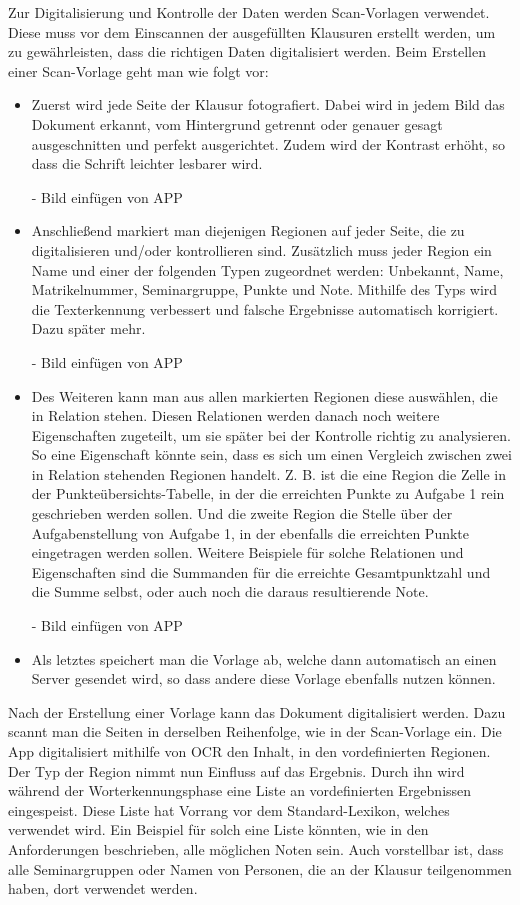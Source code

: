\documentclass[nomenclature, onesided, 150]{HSMW-Thesis}
\begin{document}
	Zur Digitalisierung und Kontrolle der Daten werden Scan-Vorlagen verwendet. Diese muss vor dem Einscannen der ausgefüllten Klausuren erstellt werden, um zu gewährleisten, dass die richtigen Daten digitalisiert werden. Beim Erstellen einer Scan-Vorlage geht man wie folgt vor:
	\begin{itemize}
		\item Zuerst wird jede Seite der Klausur fotografiert. Dabei wird in jedem Bild das Dokument erkannt, vom Hintergrund getrennt oder genauer gesagt ausgeschnitten und perfekt ausgerichtet. Zudem wird der Kontrast erhöht, so dass die Schrift leichter lesbarer wird.
		
			- Bild einfügen von APP
		
		\item Anschließend markiert man diejenigen Regionen auf jeder Seite, die zu digitalisieren und/oder kontrollieren sind. Zusätzlich muss jeder Region ein Name und einer der folgenden Typen zugeordnet werden: Unbekannt, Name, Matrikelnummer, Seminargruppe, Punkte und Note. Mithilfe des Typs wird die Texterkennung verbessert und falsche Ergebnisse automatisch korrigiert. Dazu später mehr.
		
			- Bild einfügen von APP
			
		\item Des Weiteren kann man aus allen markierten Regionen diese auswählen, die in Relation stehen. Diesen Relationen werden danach noch weitere Eigenschaften zugeteilt, um sie später bei der Kontrolle richtig zu analysieren. So eine Eigenschaft könnte sein, dass es sich um einen Vergleich zwischen zwei in Relation stehenden Regionen handelt. Z. B. ist die eine Region die Zelle in der Punkteübersichts-Tabelle, in der die erreichten Punkte zu Aufgabe 1 rein geschrieben werden sollen. Und die zweite Region die Stelle über der Aufgabenstellung von Aufgabe 1, in der ebenfalls die erreichten Punkte eingetragen werden sollen. Weitere Beispiele für solche Relationen und Eigenschaften sind die Summanden für die erreichte Gesamtpunktzahl und die Summe selbst, oder auch noch die daraus resultierende Note.
		
			- Bild einfügen von APP
		
		\item Als letztes speichert man die Vorlage ab, welche dann automatisch an einen Server gesendet wird, so dass andere diese Vorlage ebenfalls nutzen können.
	\end{itemize}
	
	Nach der Erstellung einer Vorlage kann das Dokument digitalisiert werden. Dazu scannt man die Seiten in derselben Reihenfolge, wie in der Scan-Vorlage ein. Die App digitalisiert mithilfe von OCR den Inhalt, in den vordefinierten Regionen. Der Typ der Region nimmt nun Einfluss auf das Ergebnis. Durch ihn wird während der Worterkennungsphase eine Liste an vordefinierten Ergebnissen eingespeist. Diese Liste hat Vorrang vor dem Standard-Lexikon, welches verwendet wird. Ein Beispiel für solch eine Liste könnten, wie in den Anforderungen beschrieben, alle möglichen Noten sein. Auch vorstellbar ist, dass alle Seminargruppen oder Namen von Personen, die an der Klausur teilgenommen haben, dort verwendet werden. 
	
\end{document}
